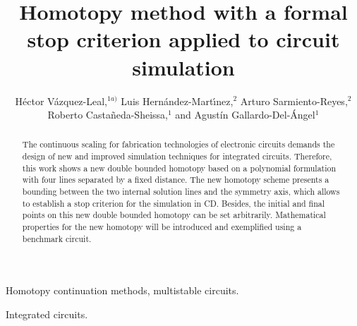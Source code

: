 \documentclass{elex}
\title{Homotopy method with a formal stop criterion applied to circuit simulation}
\author{H\'ector V\'azquez-Leal,$^{1a)}$ Luis Hern\'andez-Mart\'{\i}nez,$^{2}$ Arturo Sarmiento-Reyes,$^{2}$ Roberto Casta\~neda-Sheissa,$^{1}$ and Agust{\'i}n Gallardo-Del-\'Angel$^{1}$}
\begin{document}
\maketitle 

\begin{abstract}
The continuous scaling for fabrication technologies of electronic circuits demands the design of new and improved simulation techniques for integrated circuits. Therefore,
this work shows a new double bounded homotopy based on a polynomial formulation with four lines separated by a fixed distance. The new homotopy scheme presents a bounding between the two internal solution lines and the symmetry axis, which allows to establish a stop criterion for the simulation in CD. Besides, the initial and final points on this new double bounded homotopy can be set arbitrarily. Mathematical properties for the new homotopy will be introduced and exemplified using a benchmark circuit.
\end{abstract}

\begin{keywords}
Homotopy continuation methods, multistable circuits.
\end{keywords}

\begin{classification}
Integrated circuits.
\end{classification}
\end{document}
